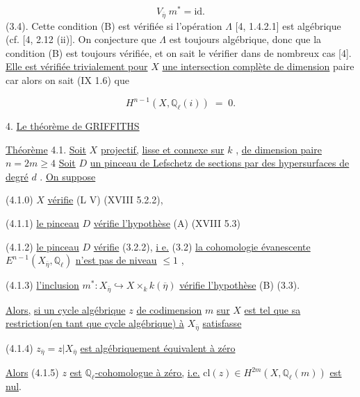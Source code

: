 \begin{equation}\tag{3.3.5}
V_{\overline{\eta}} \; m^* = \mathrm{id} .
\end{equation}
(3.4). Cette condition (B) est vérifiée si l'opération $\Lambda$ [4, 1.4.2.1] est algébrique (cf. [4, 2.12 (ii)]. On conjecture que $\Lambda$ est toujours algébrique, donc que la condition (B) est toujours vérifiée, et on sait le vérifier dans de nombreux cas [4]. \underline{Elle est vérifiée trivialement pour} $X$ \underline{une intersection complète de dimension} paire car alors on sait (IX 1.6) que

\begin{equation}\tag{3.4.1}
H^{n-1}(X,\mathbb{Q}_{\ell}(i)) \;=\; 0 .
\end{equation}



4. \underline{Le théorème de GRIFFITHS}

\underline{Théorème} 4.1. \underline{Soit} $X$ \underline{projectif,} \underline{lisse et connexe sur} $k$ , \underline{de dimension paire} $n = 2m \geq 4$ \underline{Soit} $D$ \underline{un pinceau de Lefschetz de sections par des hypersurfaces de degré} $d$ . \underline{On suppose}

(4.1.0) $X$ \underline{vérifie} (L V) (XVIII 5.2.2),

(4.1.1) \underline{le pinceau} $D$ \underline{vérifie l'hypothèse} (A) (XVIII 5.3)

(4.1.2) \underline{le pinceau} $D$ \underline{vérifie} (3.2.2), \underline{i e.} (3.2) \underline{la cohomologie évanescente} $E^{n-1}(X_{\overline{\eta}},\mathbb{Q}_{\ell})$ \underline{n'est pas  de niveau} $\leq 1$ ,

(4.1.3) \underline{l'inclusion} $m^* : X_{\overline{\eta}} \hookrightarrow X \times_{k} k(\overline{\eta})$ \underline{vérifie l'hypothèse} (B) (3.3).

\underline{Alors,} \underline{si un cycle algébrique} $z$ \underline{de codimension} $m$ \underline{sur} $X$ \underline{est tel que sa restriction(en tant que cycle algébrique) à} $X_{\overline{\eta}}$ \underline{satisfasse}

(4.1.4) $z_{\overline{\eta}} = z|X_{\overline{\eta}}$ \underline{est algébriquement équivalent à zéro}

\underline{Alors} (4.1.5) $z$ \underline{est} \underline{$\mathbb{Q}_{\ell}$-cohomologue à zéro,} \underline{i.e.} $\mathrm{cl}(z) \in H^{2m}(X,\mathbb{Q}_{\ell}(m))$ \underline{est nul}.



